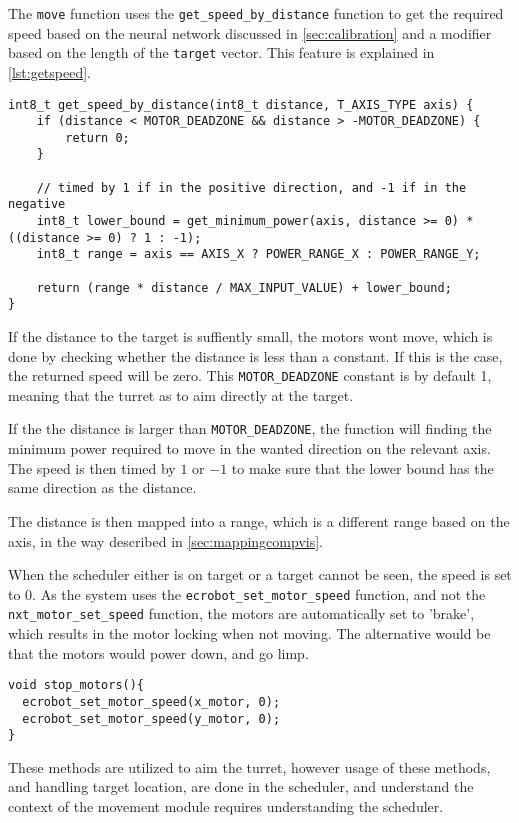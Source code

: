 The \texttt{move} function uses the \texttt{get\_speed\_by\_distance} function to get the required speed based on the neural network discussed in \autoref{sec:calibration} and a modifier based on the length of the \texttt{target} vector.
This feature is explained in \autoref{lst:getspeed}.

\begin{lstlisting}[language=CSharp,caption={get\_speed\_by\_distance method from movement.c},label={lst:getspeed},firstnumber={109}]
int8_t get_speed_by_distance(int8_t distance, T_AXIS_TYPE axis) {
	if (distance < MOTOR_DEADZONE && distance > -MOTOR_DEADZONE) {
		return 0;
	}
	
	// timed by 1 if in the positive direction, and -1 if in the negative
	int8_t lower_bound = get_minimum_power(axis, distance >= 0) * ((distance >= 0) ? 1 : -1);
	int8_t range = axis == AXIS_X ? POWER_RANGE_X : POWER_RANGE_Y;
	
	return (range * distance / MAX_INPUT_VALUE) + lower_bound;
}
\end{lstlisting}

If the distance to the target is suffiently small, the motors wont move, which is done by checking whether the distance is less than a constant.
If this is the case, the returned speed will be zero.
This \texttt{MOTOR\_DEADZONE} constant is by default 1, meaning that the turret as to aim directly at the target.

If the the distance is larger than \texttt{MOTOR\_DEADZONE}, the function will finding the minimum power required to move in the wanted direction on the relevant axis.
The speed is then timed by $1$ or $-1$ to make sure that the lower bound has the same direction as the distance.

The distance is then mapped into a range, which is a different range based on the axis, in the way described in \autoref{sec:mappingcompvis}.

When the scheduler either is on target or a target cannot be seen, the speed is set to $0$.
As the system uses the \texttt{ecrobot_set_motor_speed} function, and not the \texttt{nxt_motor_set_speed} function, the motors are automatically set to 'brake', which results in the motor locking when not moving.
The alternative would be that the motors would power down, and go limp.
\begin{lstlisting}[language=CSharp,label={lst:StopMotors},caption={stop\_motors method from movement.c}]
void stop_motors(){
  ecrobot_set_motor_speed(x_motor, 0);
  ecrobot_set_motor_speed(y_motor, 0);
}
\end{lstlisting}

These methods are utilized to aim the turret, however usage of these methods, and handling target location, are done in the scheduler, and understand the context of the movement module requires understanding the scheduler.